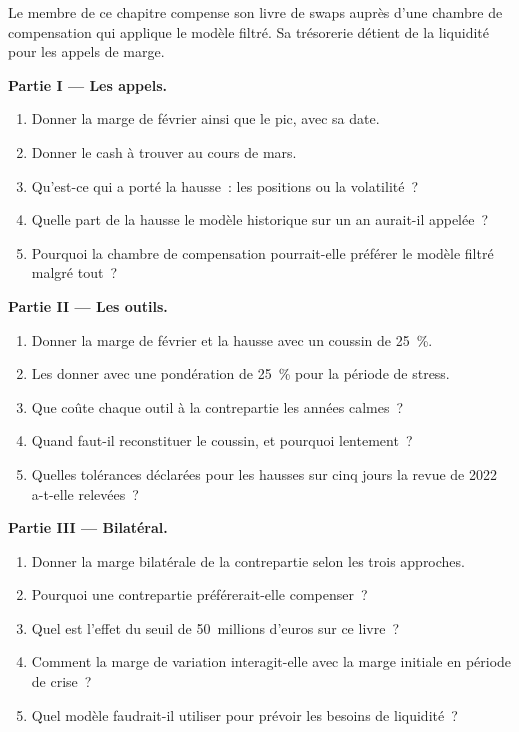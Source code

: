 \begin{problem}\label{pb:rc:margin-models:1}
Le membre de ce chapitre compense son livre de swaps auprès d'une chambre de compensation
qui applique le modèle filtré. Sa trésorerie détient de la liquidité pour les appels de marge.

\medskip\noindent\textbf{Partie I --- Les appels.}
\begin{enumerate}
\item Donner la marge de février ainsi que le pic, avec sa date.
\item Donner le cash à trouver au cours de mars.
\item Qu'est-ce qui a porté la hausse~: les positions ou la volatilité~?
\item Quelle part de la hausse le modèle historique sur un an aurait-il appelée~?
\item Pourquoi la chambre de compensation pourrait-elle préférer le modèle filtré malgré tout~?
\end{enumerate}

\medskip\noindent\textbf{Partie II --- Les outils.}
\begin{enumerate}[resume]
\item Donner la marge de février et la hausse avec un coussin de 25~\%.
\item Les donner avec une pondération de 25~\% pour la période de stress.
\item Que coûte chaque outil à la contrepartie les années calmes~?
\item Quand faut-il reconstituer le coussin, et pourquoi lentement~?
\item Quelles tolérances déclarées pour les hausses sur cinq jours la revue de 2022 a-t-elle relevées~?
\end{enumerate}

\medskip\noindent\textbf{Partie III --- Bilatéral.}
\begin{enumerate}[resume]
\item Donner la marge bilatérale de la contrepartie selon les trois approches.
\item Pourquoi une contrepartie préférerait-elle compenser~?
\item Quel est l'effet du seuil de 50~millions d'euros sur ce livre~?
\item Comment la marge de variation interagit-elle avec la marge initiale en période de crise~?
\item Quel modèle faudrait-il utiliser pour prévoir les besoins de liquidité~?
\end{enumerate}


\end{problem}

